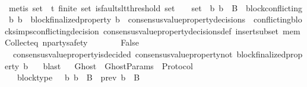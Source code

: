 \begin{isabellebody}
\ \ \ \ \ \isamarkupfalse%
\ {\isacharparenleft}metis\ {\isacartoucheopen}{\isasymsigma}{\isacharunderscore}set\ {\isasymsubseteq}\ {\isasymSigma}t{\isacartoucheclose}\ {\isacartoucheopen}finite\ {\isasymsigma}{\isacharunderscore}set{\isacartoucheclose}\ {\isacartoucheopen}is{\isacharunderscore}faults{\isacharunderscore}lt{\isacharunderscore}threshold\ {\isacharparenleft}{\isasymUnion}{\isasymsigma}{\isacharunderscore}set{\isacharparenright}{\isacartoucheclose}\ {\isacartoucheopen}{\isacharbraceleft}{\isasymsigma}{\isacharcomma}\ {\isasymsigma}{\isacharprime}{\isacharbraceright}\ {\isasymsubseteq}\ {\isasymsigma}{\isacharunderscore}set\ {\isasymand}\ {\isacharbraceleft}b{}{\isacharcomma}\ b{}{\isacharbraceright}\ {\isasymsubseteq}\ B\ {\isasymand}\ block{\isacharunderscore}conflicting\ {\isacharparenleft}b{}{\isacharcomma}\ b{}{\isacharparenright}\ {\isasymand}\ block{\isacharunderscore}finalized{\isacharunderscore}property\ b{}\ {\isasymin}\ consensus{\isacharunderscore}value{\isacharunderscore}property{\isacharunderscore}decisions\ {\isasymsigma}{\isacartoucheclose}\ conflicting{\isacharunderscore}blocks{\isacharunderscore}imps{\isacharunderscore}conflicting{\isacharunderscore}decision\ consensus{\isacharunderscore}value{\isacharunderscore}property{\isacharunderscore}decisions{\isacharunderscore}def\ insert{\isacharunderscore}subset\ mem{\isacharunderscore}Collect{\isacharunderscore}eq\ n{\isacharunderscore}party{\isacharunderscore}safety{\isacharparenright}\ \isanewline
\ \ \ \isamarkupfalse%
\ \isamarkupfalse%
\ False\isanewline
\ \ \ \ \ \isamarkupfalse%
\ {\isacartoucheopen}{\isasymnot}\ consensus{\isacharunderscore}value{\isacharunderscore}property{\isacharunderscore}is{\isacharunderscore}decided\ {\isacharparenleft}consensus{\isacharunderscore}value{\isacharunderscore}property{\isacharunderscore}not\ {\isacharparenleft}block{\isacharunderscore}finalized{\isacharunderscore}property\ b{}{\isacharparenright}{\isacharcomma}\ {\isasymsigma}{\isacharprime}{\isacharparenright}{\isacartoucheclose}\ \isamarkupfalse%
\ blast\isanewline
\ \isamarkupfalse%
%
\endisatagproof
{\isafoldproof}%
%
\isadelimproof
\isanewline
%
\endisadelimproof
\isanewline
\isanewline
{}\isamarkupfalse%
\ Ghost\ {\isacharequal}\ GhostParams\ {\isacharplus}\ Protocol\ {\isacharplus}\isanewline
\ \ \ block{\isacharunderscore}type\ {\isacharcolon}\ {\isachardoublequoteopen}{\isasymforall}\ b{\isachardot}\ b\ {\isasymin}\ B\ {\isasymlongleftrightarrow}\ prev\ b\ {\isasymin}\ B{\isachardoublequoteclose}\isanewline

\end{isabellebody}

